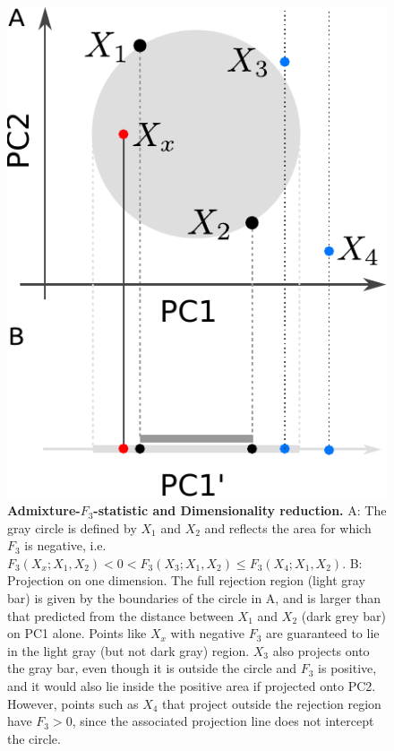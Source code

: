 \documentclass[12pt,fullpage, a4paper]{article}
\begin{document}
\begin{figure}[!ht]
	\includegraphics[width=.4\textwidth]{figures/fig_proj.pdf}
	\caption{\textbf{Admixture-$F_3$-statistic and Dimensionality reduction.} A: The gray circle is defined by $X_1$ and $X_2$ and reflects the area for which $F_3$ is negative, i.e. $F_3(X_x; X_1, X_2) < 0 < F_3(X_3; X_1, X_2) \leq F_3(X_4; X_1, X_2)$. B: Projection on one dimension. The full rejection region (light gray bar) is given by the boundaries of the circle in A, and is larger than that predicted from the distance between $X_1$ and $X_2$ (dark grey bar) on PC1 alone. Points like $X_x$ with negative $F_3$ are guaranteed to lie in the light gray (but not dark gray) region. $X_3$ also projects onto the gray bar, even though it is outside the circle and $F_3$ is positive, and it would also lie inside the positive area if projected onto PC2. However, points such as $X_4$ that project outside the rejection region have $F_3>0$, since the associated projection line does not intercept the circle.}
	\label{fig:proj}
\end{figure}
\end{document}
